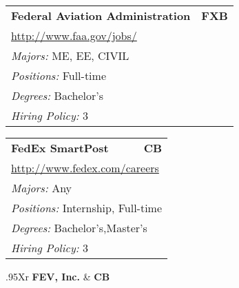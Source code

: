 \documentclass[twoside]{article}
\begin{document}
\begin{center}
\begin{multicols}{3}
\begin{FlushLeft}
\begin{minipage}{.9\columnwidth}
\end{minipage}
 
\begin{minipage}{.9\columnwidth}\begin{tabularx}{.95\columnwidth}{Xr}
                 {\Large\bf Federal Aviation Administration} & {\Large\bf FXB}\\
    \multicolumn{2}{p{.95\columnwidth}}{\url{http://www.faa.gov/jobs/}}\\
    \multicolumn{2}{p{.95\columnwidth}}{\emph{Majors:} ME, EE, CIVIL}\\
    \multicolumn{2}{p{.95\columnwidth}}{\emph{Positions:} Full-time}\\
    \multicolumn{2}{p{.95\columnwidth}}{\emph{Degrees:} Bachelor's}\\
    \multicolumn{2}{p{.95\columnwidth}}{\emph{Hiring Policy:} 3}\\
    \end{tabularx}
    
\end{minipage}
 
\begin{minipage}{.9\columnwidth}\begin{tabularx}{.95\columnwidth}{Xr}
                 {\Large\bf FedEx SmartPost} & {\Large\bf CB}\\
    \multicolumn{2}{p{.95\columnwidth}}{\url{http://www.fedex.com/careers}}\\
    \multicolumn{2}{p{.95\columnwidth}}{\emph{Majors:} Any}\\
    \multicolumn{2}{p{.95\columnwidth}}{\emph{Positions:} Internship, Full-time}\\
    \multicolumn{2}{p{.95\columnwidth}}{\emph{Degrees:} Bachelor's,Master's}\\
    \multicolumn{2}{p{.95\columnwidth}}{\emph{Hiring Policy:} 3}\\
    \end{tabularx}
    
\end{minipage}
 
\begin{minipage}{.9\columnwidth}\begin{tabularx}{.95\columnwidth}{Xr}
                 {\Large\bf FEV, Inc.} & {\Large\bf CB}\\
    \\
    \\
    \\
    \\
    \\
    \end{tabularx}
    

\end{minipage}
\end{FlushLeft}
\end{multicols}
\end{center}
\end{document}
